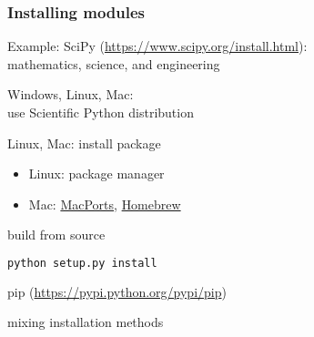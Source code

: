\begin{frame}[fragile]
\frametitle{Installing modules~\faWrench}

Example: SciPy (\url{https://www.scipy.org/install.html}):\\
mathematics, science, and engineering

\begin{description}
\item<2->[Easy way:] Windows, Linux, Mac:\\
use Scientific Python distribution
\item<3->[Intermediate:] Linux, Mac: install package\\
\begin{itemize}
\item Linux: package manager
\item Mac: \href{https://www.macports.org/}{MacPorts}, \href{http://brew.sh/}{Homebrew}
\end{itemize}
\item<4->[Harder:] build from source
\begin{lstlisting}[language=bash]
python setup.py install
\end{lstlisting}
\item<5->[Better:] pip (\url{https://pypi.python.org/pypi/pip})
\item<6->[\faWarning~Avoid:] mixing installation methods

\end{description}

\end{frame}


